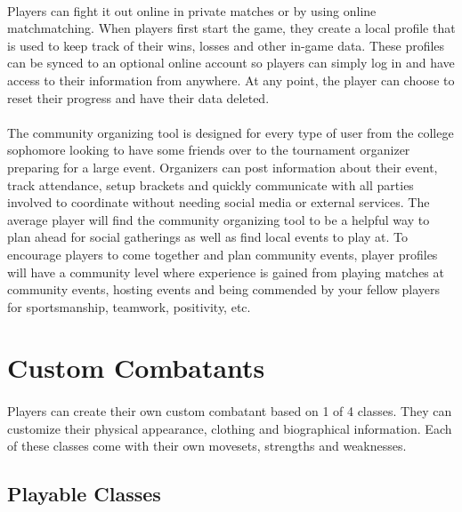 \paragraph{} Players can fight it out online in private matches or by using online matchmatching. When players first start the game, they create a local profile that is used to keep track of their wins, losses and other in-game data. These profiles can be synced to an optional online account so players can simply log in and have access to their information from anywhere. At any point, the player can choose to reset their progress and have their data deleted.

\paragraph{} The community organizing tool is designed for every type of user from the college sophomore looking to have some friends over to the tournament organizer preparing for a large event. Organizers can post information about their event, track attendance, setup brackets and quickly communicate with all parties involved to coordinate without needing social media or external services. The average player will find the community organizing tool to be a helpful way to plan ahead for social gatherings as well as find local events to play at. To encourage players to come together and plan community events, player profiles will have a community level where experience is gained from playing matches at community events, hosting events and being commended by your fellow players for sportsmanship, teamwork, positivity, etc.

\section{Custom Combatants}

\paragraph{} Players can create their own custom combatant based on 1 of 4 classes. They can customize their physical appearance, clothing and biographical information. Each of these classes come with their own movesets, strengths and weaknesses.

\subsection{Playable Classes}

